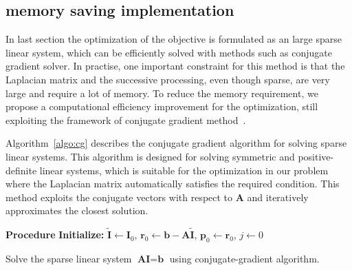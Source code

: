 \subsection{memory saving implementation}
\label{sec2.3.3}
In last section the optimization of the objective is formulated as an large sparse linear system, which can be efficiently solved with methods such as conjugate gradient solver. In practise, one important constraint for this method is that the Laplacian matrix and the successive processing, even though sparse, are very large and require a lot of memory. To reduce the memory requirement, we propose a computational efficiency improvement for the optimization, still exploiting the framework of conjugate gradient method~\cite{he2010fast,yu2014computational}.

Algorithm~\ref{algo:cg} describes the conjugate gradient algorithm for solving sparse linear systems. This algorithm is designed for solving symmetric and positive-definite linear systems, which is suitable for the optimization in our problem where the Laplacian matrix automatically satisfies the required condition. This method exploits the conjugate vectors with respect to $\textbf{A}$ and iteratively approximates the closest solution.

\begin{algorithm}
\vspace{0.1in}
\vspace{0.1in}
\textbf{Procedure}\:
\vspace{0.1in}
\textbf{Initialize:} $\tilde{\textbf{I}}\leftarrow \textbf{I}_0$, $\textbf{r}_0\leftarrow \textbf{b}-\textbf{A}\tilde{\textbf{I}}$, $\textbf{p}_0\leftarrow \textbf{r}_0$, $j\leftarrow 0$\;
\vspace{0.1in}
\vspace{0.1in}
\caption{Solve the sparse linear system $\textbf{AI} = \textbf{b}$ using conjugate-gradient algorithm.}
\label{algo:cg}
\end{algorithm}

